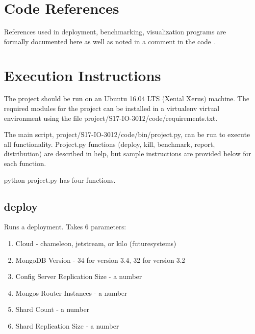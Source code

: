 \documentclass[9pt,twocolumn,twoside]{../../styles/osajnl}
\begin{document}
\newpage

\appendix

\section{Code References}
References used in deployment, benchmarking, visualization programs are formally documented here as well as noted in a comment in the code \cite{www-bashNum} \cite{www-lastChar} \cite{www-configOpts} \cite{www-bashArgs} \cite{www-cmVms}  \cite{www-python1}  \cite{www-python2}  \cite{www-python3} \cite{www-ansibleDir} \cite{www-mongoAnsible} \cite{www-ansibleCopy} \cite{www-ansibleHost} \cite{www-installMongo} \cite{www-ansiblePython}.

\section{Execution Instructions}

The project should be run on an Ubuntu 16.04 LTS (Xenial Xerus)
machine. The required modules for the project can be installed in a
virtualenv virtual environment using the file
project/S17-IO-3012/code/requirements.txt.

The main script, project/S17-IO-3012/code/bin/project.py, can be run
to execute all functionality. Project.py functions (deploy, kill,
benchmark, report, distribution) are described in help, but sample
instructions are provided below for each function.

python project.py has four functions.

\subsection{deploy}

Runs a deployment.  Takes 6 parameters:


\begin{enumerate}

\item Cloud - chameleon, jetstream, or kilo (futuresystems)
\item MongoDB Version - 34 for version 3.4, 32 for version 3.2
\item Config Server Replication Size - a number
\item Mongos Router Instances - a number
\item Shard Count - a number
\item Shard Replication Size - a number


\end{enumerate}
\end{document}
